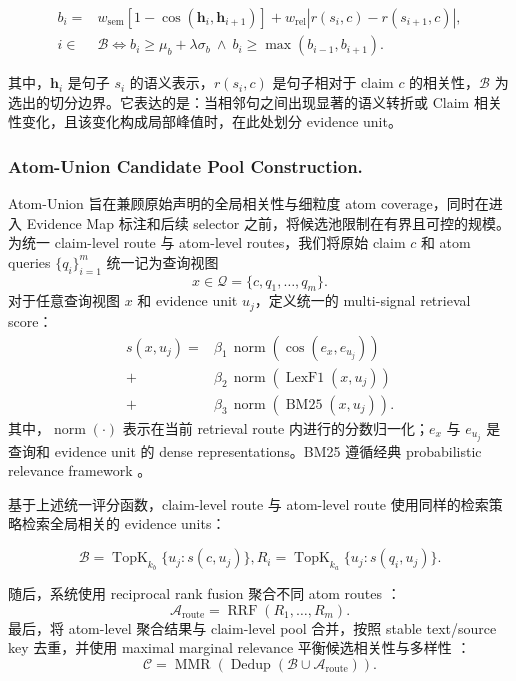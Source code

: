 \documentclass[letterpaper]{article}
\begin{document}
\[
\begin{aligned}
    b_i=&w_{\mathrm{sem}}\!\left[1-\cos(\mathbf h_i,\mathbf h_{i+1})\right]+w_{\mathrm{rel}}\!\left|r(s_i,c)-r(s_{i+1},c)\right|,\\
    i\in&\mathcal B\iff b_i\ge \mu_b+\lambda\sigma_b\ \land\ b_i\ge\max(b_{i-1},b_{i+1}).
\end{aligned}
\]

其中，\(\mathbf h_i\) 是句子 \(s_i\) 的语义表示，\(r(s_i,c)\) 是句子相对于 claim \(c\) 的相关性，\(\mathcal B\) 为选出的切分边界。它表达的是：当相邻句之间出现显著的语义转折或 Claim 相关性变化，且该变化构成局部峰值时，在此处划分 evidence unit。

\subsubsection{Atom-Union Candidate Pool Construction.}

Atom-Union 旨在兼顾原始声明的全局相关性与细粒度 atom coverage，同时在进入 Evidence Map 标注和后续 selector 之前，将候选池限制在有界且可控的规模。为统一 claim-level route 与 atom-level routes，我们将原始 claim $c$ 和 atom queries $\{q_i\}_{i=1}^{m}$ 统一记为查询视图
\[
x\in\mathcal Q=\{c,q_1,\ldots,q_m\}.
\]
对于任意查询视图 $x$ 和 evidence unit $u_j$，定义统一的 multi-signal retrieval score：
\[
\begin{aligned}
s(x,u_j)
={}&\beta_1\,\operatorname{norm}\!\left(\cos(e_x,e_{u_j})\right)\\
+&\beta_2\,\operatorname{norm}\!\left(\operatorname{LexF1}(x,u_j)\right)\\
+&\beta_3\,\operatorname{norm}\!\left(\operatorname{BM25}(x,u_j)\right).
\end{aligned}
\]
其中，$\operatorname{norm}(\cdot)$ 表示在当前 retrieval route 内进行的分数归一化；$e_x$ 与 $e_{u_j}$ 是查询和 evidence unit 的 dense representations。BM25 遵循经典 probabilistic relevance framework \citep{Robertson2009BM25}。

基于上述统一评分函数，claim-level route 与 atom-level route 使用同样的检索策略检索全局相关的 evidence units：

\[
    \mathcal B = \operatorname{TopK}_{k_b}\{u_j:s(c,u_j)\}, R_i = \operatorname{TopK}_{k_a}\{u_j:s(q_i,u_j)\}.
\]

随后，系统使用 reciprocal rank fusion 聚合不同 atom routes \citep{Cormack2009RRF}：
\[
\mathcal A_{\mathrm{route}}
=
\operatorname{RRF}(R_1,\ldots,R_m).
\]
最后，将 atom-level 聚合结果与 claim-level pool 合并，按照 stable text/source key 去重，并使用 maximal marginal relevance 平衡候选相关性与多样性 \citep{Goldstein1998MMR}：
\[
\mathcal C
=
\operatorname{MMR}\!\left(
\operatorname{Dedup}
\left(
\mathcal B\cup\mathcal A_{\mathrm{route}}
\right)
\right).
\]
\end{document}

